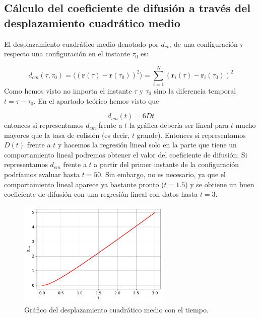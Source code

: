 \documentclass[11pt]{article} %
\newcommand{\rn}{\mathbf{r}}
\begin{document}
\subsection[Coeficiente de difusión a través de $d_{cm}$]{Cálculo del coeficiente de difusión a través del desplazamiento cuadrático medio}

El desplazamiento cuadrático medio denotado por $d_{cm}$ de una configuración $\tau$ respecto una configuración en el instante $\tau_0$ es:

\begin{equation}
		d_{cm}(\tau,\tau_0)=\langle (\rn(\tau)-\rn(\tau_0))^2 \rangle = \sum_{i=1}^N (\rn_i(\tau)-\rn_i(\tau_0))^2  
\end{equation}
Como hemos visto no importa el instante $\tau$ y $\tau_0$ sino la diferencia temporal $t=\tau-\tau_0$. En el apartado teórico hemos visto que

\begin{equation}
	d_{cm} (t)= 6D t
\end{equation}
entonces si representamos $d_{cm}$ frente a $t$ la gráfica debería ser lineal para $t$ mucho mayores que la tasa de colisión (es decir, $t$ grande). Entonces si representamos $D(t)$ frente a $t$ y hacemos la regresión lineal solo en la parte que tiene un comportamiento lineal podremos obtener el valor del coeficiente de difusión. Si representamos $d_{cm}$ frente a $t$ a partir del primer instante de la configuración podríamos evaluar hasta $t=50$. Sin embargo, no es necesario, ya que el comportamiento lineal aparece ya bastante pronto ($t=1.5$) y se obtiene un buen coeficiente de difusión con una regresión lineal con datos hasta $t=3$.

\begin{figure}[h!] \centering
	\includegraphics[width=0.65\textwidth]{../../Graficas/Optativo2/dcm2.pdf}
	\caption{Gráfico del desplazamiento cuadrático medio con el tiempo.}
	\label{Fig:02}
\end{figure}
\end{document}
